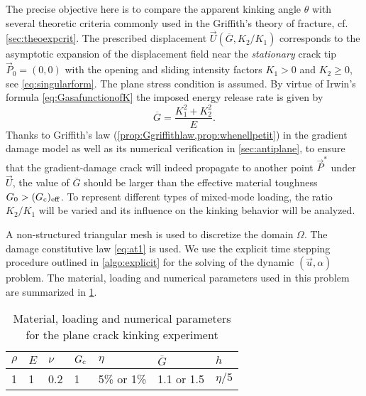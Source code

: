 The precise objective here is to compare the apparent kinking angle $\theta$ with several theoretic criteria commonly used in the Griffith's theory of fracture, cf. \cref{sec:theoexpcrit}. The prescribed displacement $\vec{U}(\overline{G},K_2/K_1)$ corresponds to the asymptotic expansion of the displacement field near the \emph{stationary} crack tip $\vec{P}_0=(0,0)$ with the opening and sliding intensity factors $K_1>0$ and $K_2\geq 0$, see \eqref{eq:singularform}. The plane stress condition is assumed. By virtue of Irwin's formula \eqref{eq:GasafunctionofK} the imposed energy release rate is given by
\[
\overline{G}=\frac{K_1^2+K_2^2}{E}.
\]
Thanks to Griffith's law (\cref{prop:Ggriffithlaw,prop:whenellpetit}) in the gradient damage model as well as its numerical verification in \cref{sec:antiplane}, to ensure that the gradient-damage crack will indeed propagate to another point $\vec{P}^*$ under $\vec{U}$, the value of $\overline{G}$ should be larger than the effective material toughness $G_0>(G_\mathrm{c})_\mathrm{eff}$. To represent different types of mixed-mode loading, the ratio $K_2/K_1$ will be varied and its influence on the kinking behavior will be analyzed.

A non-structured triangular mesh is used to discretize the domain $\Omega$. The damage constitutive law \eqref{eq:at1} is used. We use the explicit time stepping procedure outlined in \cref{algo:explicit} for the solving of the dynamic $(\vec{u},\alpha)$ problem. The material, loading and numerical parameters used in this problem are summarized in \cref{tab:kinking}. 
\begin{table}[htbp]
\centering
\caption{Material, loading and numerical parameters for the plane crack kinking experiment} \label{tab:kinking}
\begin{tabular}{lllllll} \toprule
$\rho$ & $E$ & $\nu$ & $G_\mathrm{c}$ & $\eta$ & $\overline{G}$ & $h$ \\ \midrule
1 & 1 & 0.2 & 1 & 5\% or 1\% & 1.1 or 1.5 & $\eta/5$ \\ \bottomrule
\end{tabular}
\end{table}


